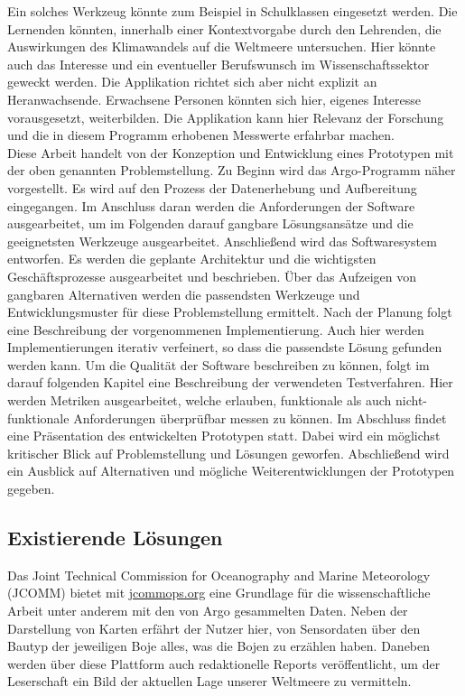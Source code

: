 Ein solches Werkzeug könnte zum Beispiel in Schulklassen eingesetzt werden.
Die Lernenden könnten, innerhalb einer Kontextvorgabe durch den Lehrenden, die Auswirkungen des Klimawandels auf die Weltmeere untersuchen.
Hier könnte auch das Interesse und ein eventueller Berufswunsch im Wissenschaftssektor geweckt werden.
Die Applikation richtet sich aber nicht explizit an Heranwachsende. Erwachsene Personen könnten sich hier, eigenes Interesse vorausgesetzt, weiterbilden. Die Applikation kann hier Relevanz der Forschung und die in diesem Programm erhobenen Messwerte erfahrbar machen. \\


Diese Arbeit handelt von der Konzeption und Entwicklung eines Prototypen mit der oben genannten Problemstellung. Zu Beginn wird das Argo-Programm näher vorgestellt. Es wird auf den Prozess der Datenerhebung und Aufbereitung eingegangen. Im Anschluss daran werden die Anforderungen der Software ausgearbeitet, um im Folgenden darauf gangbare Lösungsansätze und die geeignetsten Werkzeuge ausgearbeitet.
Anschließend wird das Softwaresystem entworfen. Es werden die geplante Architektur und die wichtigsten Geschäftsprozesse ausgearbeitet und beschrieben. Über das
Aufzeigen von gangbaren Alternativen werden die passendsten Werkzeuge und Entwicklungsmuster für diese Problemstellung ermittelt.
Nach der Planung folgt eine Beschreibung der vorgenommenen Implementierung. Auch hier werden Implementierungen iterativ verfeinert, so dass die passendste Lösung gefunden werden kann.
Um die Qualität der Software beschreiben zu können, folgt im darauf folgenden Kapitel eine Beschreibung der verwendeten Testverfahren. Hier werden Metriken ausgearbeitet, welche erlauben, funktionale als auch nicht-funktionale Anforderungen überprüfbar messen zu können.
Im Abschluss findet eine Präsentation des entwickelten Prototypen statt. Dabei wird ein möglichst kritischer Blick auf Problemstellung und Lösungen geworfen. Abschließend wird ein Ausblick auf Alternativen und mögliche Weiterentwicklungen der Prototypen gegeben.


\pagebreak
\subsection{Existierende Lösungen}


Das Joint Technical Commission for Oceanography and Marine Meteorology (JCOMM) bietet mit
\url{jcommops.org} eine Grundlage für die wissenschaftliche Arbeit unter anderem mit den von Argo gesammelten Daten. Neben der Darstellung von Karten erfährt der Nutzer hier, von Sensordaten über den Bautyp der jeweiligen Boje alles, was die Bojen zu erzählen haben. Daneben werden über diese Plattform auch redaktionelle Reports veröffentlicht, um der Leserschaft ein Bild der aktuellen Lage unserer Weltmeere zu vermitteln.

